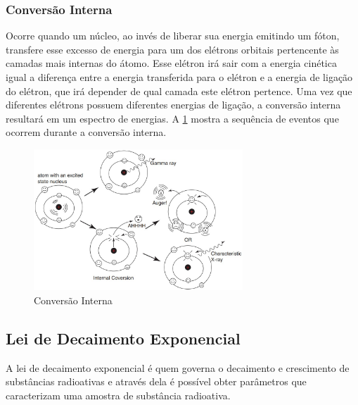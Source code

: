 \documentclass[11pt,a4paper]{article}
\begin{document}
\subsubsection*{Conversão Interna}


    Ocorre quando um núcleo, ao invés de liberar sua energia emitindo um fóton, transfere esse excesso de energia para um dos elétrons orbitais pertencente às camadas mais internas do átomo.  Esse elétron irá sair com a energia cinética igual a diferença entre a energia transferida para o elétron e a energia de ligação do elétron, que irá depender de qual camada este elétron pertence. Uma vez que diferentes elétrons possuem diferentes energias de ligação, a conversão interna resultará em um espectro de energias. A \ref{fig:processoDeConversaoInterna} mostra a sequência de eventos que ocorrem durante a conversão interna.


                \begin{figure}[h]
                    \centering
                    \includegraphics[width=0.7\textwidth]{Imagens/processoDeConversaoInterna.jpg}
                    \caption{Conversão Interna}
                    \label{fig:processoDeConversaoInterna}
                \end{figure}


\subsection*{Lei de Decaimento Exponencial}

    A lei de decaimento exponencial é quem governa o decaimento e crescimento de substâncias radioativas e através dela é possível obter parâmetros que caracterizam uma amostra de substância radioativa.
            
\end{document}
